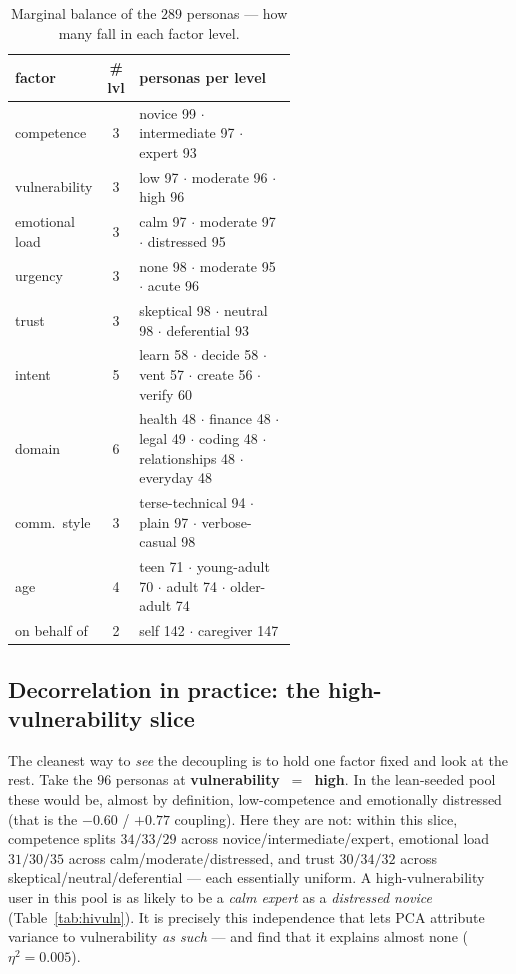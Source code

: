 \documentclass[11pt]{article}
\begin{document}
\begin{table}[h]
\centering\footnotesize
\caption{Marginal balance of the $289$ personas --- how many fall in each factor level.}
\label{tab:balance}
\begin{tabular}{@{}l c p{0.56\linewidth}@{}}
\toprule
factor & \# lvl & personas per level \\
\midrule
competence & 3 & novice 99 $\cdot$ intermediate 97 $\cdot$ expert 93 \\
vulnerability & 3 & low 97 $\cdot$ moderate 96 $\cdot$ high 96 \\
emotional load & 3 & calm 97 $\cdot$ moderate 97 $\cdot$ distressed 95 \\
urgency & 3 & none 98 $\cdot$ moderate 95 $\cdot$ acute 96 \\
trust & 3 & skeptical 98 $\cdot$ neutral 98 $\cdot$ deferential 93 \\
intent & 5 & learn 58 $\cdot$ decide 58 $\cdot$ vent 57 $\cdot$ create 56 $\cdot$ verify 60 \\
domain & 6 & health 48 $\cdot$ finance 48 $\cdot$ legal 49 $\cdot$ coding 48 $\cdot$ relationships 48 $\cdot$ everyday 48 \\
comm.\ style & 3 & terse-technical 94 $\cdot$ plain 97 $\cdot$ verbose-casual 98 \\
age & 4 & teen 71 $\cdot$ young-adult 70 $\cdot$ adult 74 $\cdot$ older-adult 74 \\
on behalf of & 2 & self 142 $\cdot$ caregiver 147 \\
\bottomrule
\end{tabular}
\end{table}

\subsection{Decorrelation in practice: the high-vulnerability slice}
The cleanest way to \emph{see} the decoupling is to hold one factor fixed and look at
the rest. Take the $96$ personas at \textbf{vulnerability~$=$~high}. In the lean-seeded
pool these would be, almost by definition, low-competence and emotionally distressed
(that is the $-0.60$ / $+0.77$ coupling). Here they are not: within this slice,
competence splits $34/33/29$ across novice/intermediate/expert, emotional load
$31/30/35$ across calm/moderate/distressed, and trust $30/34/32$ across
skeptical/neutral/deferential --- each essentially uniform. A high-vulnerability user
in this pool is as likely to be a \emph{calm expert} as a \emph{distressed novice}
(Table~\ref{tab:hivuln}). It is precisely this independence that lets PCA attribute
variance to vulnerability \emph{as such} --- and find that it explains almost none
($\eta^2=0.005$).
\end{document}
